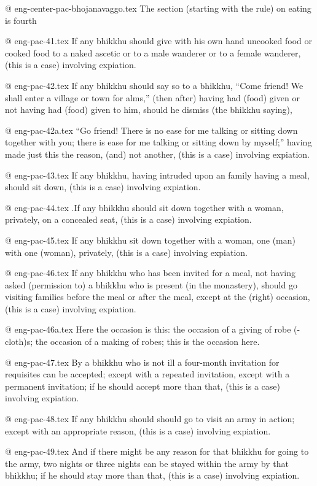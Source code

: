 @ eng-center-pac-bhojanavaggo.tex
The section (starting with the rule) on eating is fourth

@ eng-pac-41.tex
If any bhikkhu should give with his own hand uncooked food or cooked food to a naked ascetic or to a male wanderer or to a female wanderer, (this is a case) involving expiation.

@ eng-pac-42.tex
If any bhikkhu should say so to a bhikkhu, “Come friend! We shall enter a village or town for alms,” (then after) having had (food) given or not having had (food) given to him, should he dismiss (the bhikkhu saying),

@ eng-pac-42a.tex
“Go friend! There is no ease for me talking or sitting down together with you; there is ease for me talking or sitting down by myself;” having made just this the reason, (and) not another, (this is a case) involving expiation.

@ eng-pac-43.tex
If any bhikkhu, having intruded upon an family having a meal, should sit down, (this is a case) involving expiation.

@ eng-pac-44.tex
.If any bhikkhu should sit down together with a woman, privately, on a concealed seat, (this is a case) involving expiation.

@ eng-pac-45.tex
If any bhikkhu sit down together with a woman, one (man) with one (woman), privately, (this is a case) involving expiation.

@ eng-pac-46.tex
If any bhikkhu who has been invited for a meal, not having asked (permission to) a bhikkhu who is present (in the monastery), should go visiting families before the meal or after the meal, except at the (right) occasion, (this is a case) involving expiation.

@ eng-pac-46a.tex
Here the occasion is this: the occasion of a giving of robe (-cloth)s; the occasion of a making of robes; this is the occasion here.

@ eng-pac-47.tex
By a bhikkhu who is not ill a four-month invitation for requisites can be accepted; except with a repeated invitation, except with a permanent invitation; if he should accept more than that, (this is a case) involving expiation.

@ eng-pac-48.tex
If any bhikkhu should should go to visit an army in action; except with an appropriate reason, (this is a case) involving expiation.

@ eng-pac-49.tex
And if there might be any reason for that bhikkhu for going to the army, two nights or three nights can be stayed within the army by that bhikkhu; if he should stay more than that, (this is a case) involving expiation.


